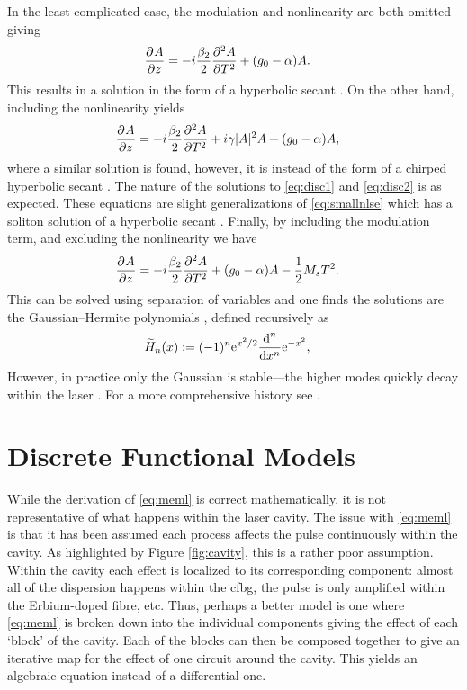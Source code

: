 In the least complicated case, the modulation and nonlinearity are both omitted giving
\begin{align}
\pdiff{A}{z} &= - i \frac{\beta_2}{2}\pdiff[2]{A}{T} + \left( g_0 - \alpha \right) A.
\label{eq:disc1}
\end{align}
This results in a solution in the form of a hyperbolic secant \cite{haus1975, haus1986, haus1992}. On the other hand, including the nonlinearity yields
\begin{align}
\pdiff{A}{z} &= - i \frac{\beta_2}{2}\pdiff[2]{A}{T} + i \gamma |A|^2 A + \left( g_0 - \alpha \right) A,
\label{eq:disc2}
\end{align}
where a similar solution is found, however, it is instead of the form of a chirped hyperbolic secant \cite{haus1991, usechak}. The nature of the solutions to \eqref{eq:disc1} and \eqref{eq:disc2} is as expected. These equations are slight generalizations of \eqref{eq:smallnlse} which has a soliton solution of a hyperbolic secant \cite{ferreira}. Finally, by including the modulation term, and excluding the nonlinearity we have
\begin{align}
\pdiff{A}{z} &= - i \frac{\beta_2}{2}\pdiff[2]{A}{T} + \left( g_0 - \alpha \right) A - \frac{1}{2}M_s T^2.
\end{align}
This can be solved using separation of variables and one finds the solutions are the Gaussian--Hermite polynomials \cite{burgoyne2014, hausbook, haus1975, haus1996, haus2000, kartner, tamura1996, usechak}, defined recursively as
\begin{align}
\Her{n}{x} &:= (-1)^n \textrm{e}^{x^2 / 2} \diff[n]{}{x} \textrm{e}^{-x^2},
\label{eq:gaussherm}
\end{align}
However, in practice only the Gaussian is stable---the higher modes quickly decay within the laser \cite{hausbook, haus1975, haus1996, haus2000}. For a more comprehensive history see \cite{haus2000}. \\

\section{Discrete Functional Models}
\label{sec:discrete}
While the derivation of \eqref{eq:meml} is correct mathematically, it is not representative of what happens within the laser cavity. The issue with \eqref{eq:meml} is that it has been assumed each process affects the pulse continuously within the cavity. As highlighted by Figure \ref{fig:cavity}, this is a rather poor assumption. Within the cavity each effect is localized to its corresponding component: almost all of the dispersion happens within the \gls{cfbg}, the pulse is only amplified within the Erbium-doped fibre, etc. Thus, perhaps a better model is one where \eqref{eq:meml} is broken down into the individual components giving the effect of each `block' of the cavity. Each of the blocks can then be composed together to give an iterative map for the effect of one circuit around the cavity. This yields an algebraic equation instead of a differential one. \\


